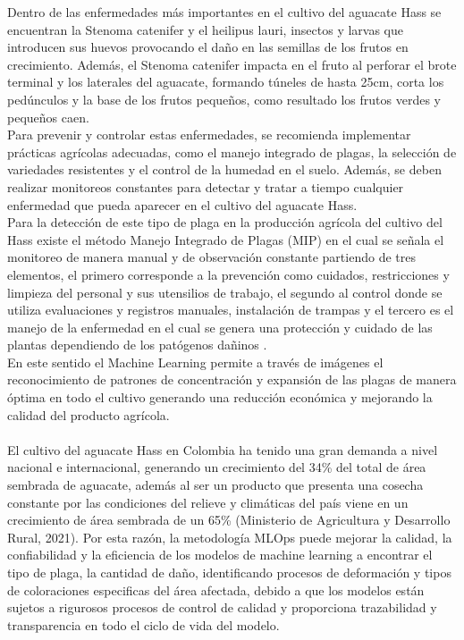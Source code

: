 Dentro de las enfermedades más importantes en el cultivo del aguacate Hass se encuentran 
la Stenoma catenifer y el heilipus lauri, insectos y larvas que introducen sus huevos provocando el daño en las semillas de los frutos en crecimiento. Además, el Stenoma catenifer impacta en el fruto al perforar el brote terminal y los laterales del aguacate, formando túneles de hasta 25cm, corta los pedúnculos y la base de los frutos pequeños, como resultado los frutos verdes y pequeños caen.\\

Para prevenir y controlar estas enfermedades, se recomienda implementar prácticas agrícolas adecuadas, como el manejo integrado de plagas, la selección de variedades resistentes y el control de la humedad en el suelo. Además, se deben realizar monitoreos constantes para detectar y tratar a tiempo cualquier enfermedad que pueda aparecer en el cultivo del aguacate Hass.\\

Para la detección de este tipo de plaga en la producción agrícola del cultivo del Hass existe el método Manejo Integrado de Plagas (MIP) en el cual se señala el monitoreo de manera manual y de observación constante partiendo de tres elementos, el primero corresponde a la prevención como cuidados, restricciones y limpieza del personal y sus utensilios de trabajo, el segundo al control donde se utiliza evaluaciones y registros manuales, instalación de trampas y el tercero es el manejo de la enfermedad en el cual se genera una protección y cuidado de las plantas dependiendo de los patógenos dañinos \citet{ica2012manejo}.\\

En este sentido el Machine Learning permite a través de imágenes el reconocimiento de patrones de concentración y expansión de las plagas de manera óptima en todo el cultivo generando una reducción económica y mejorando la calidad del producto agrícola.\\\\

El cultivo del aguacate Hass en Colombia ha tenido una gran demanda a nivel nacional e internacional, generando un crecimiento del 34\% del total de área sembrada de aguacate, además al ser un producto que presenta una cosecha constante por las condiciones del relieve y climáticas del país viene en un crecimiento de área sembrada de un 65\% (Ministerio de Agricultura y Desarrollo Rural, 2021). Por esta razón, la metodología MLOps puede mejorar la calidad, la confiabilidad y la eficiencia de los modelos de machine learning a encontrar el tipo de plaga, la cantidad de daño, identificando procesos de deformación y tipos de coloraciones especificas del área afectada, debido a que los modelos están sujetos a rigurosos procesos de control de calidad y proporciona trazabilidad y transparencia en todo el ciclo de vida del modelo.\\

